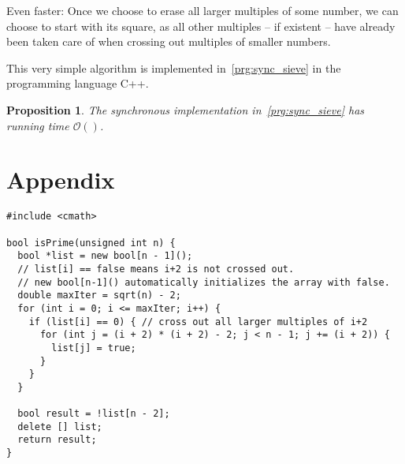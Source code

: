 \documentclass[a4paper,12pt]{article}
\newtheorem{proposition}{Proposition}
\newcommand{\bigO}{\mathcal{O}}
\begin{document}
Even faster: Once we choose to erase all larger multiples of some number, we can choose to start with its square, as all other multiples -- if existent -- have already been taken care of when crossing out multiples of smaller numbers.

This very simple algorithm is implemented in~\autoref{prg:sync_sieve} in the programming language C++.

\begin{proposition}
	The synchronous implementation in~\autoref{prg:sync_sieve} has running time $\bigO()$.
\end{proposition}

\appendix
\section{Appendix}
 	\begin{lstlisting}[caption={Synchronous implementation of the Sieve of Eratosthenes}, label={prg:sync_sieve}, frame={single}]
#include <cmath>
	
bool isPrime(unsigned int n) {
  bool *list = new bool[n - 1]();
  // list[i] == false means i+2 is not crossed out.
  // new bool[n-1]() automatically initializes the array with false.
  double maxIter = sqrt(n) - 2;
  for (int i = 0; i <= maxIter; i++) {
    if (list[i] == 0) { // cross out all larger multiples of i+2
      for (int j = (i + 2) * (i + 2) - 2; j < n - 1; j += (i + 2)) {
        list[j] = true;
      }
    }
  }

  bool result = !list[n - 2];
  delete [] list;
  return result;
}
	\end{lstlisting}
	
\end{document}
